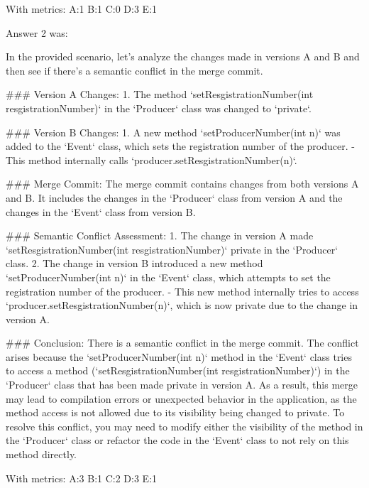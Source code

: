 With metrics:
A:1
B:1
C:0
D:3
E:1

Answer 2 was:
\begin{spverbatim}
In the provided scenario, let's analyze the changes made in versions A and B and then see if there's a semantic conflict in the merge commit.

### Version A Changes:
1. The method `setResgistrationNumber(int resgistrationNumber)` in the `Producer` class was changed to `private`.

### Version B Changes:
1. A new method `setProducerNumber(int n)` was added to the `Event` class, which sets the registration number of the producer.
   - This method internally calls `producer.setResgistrationNumber(n)`.

### Merge Commit:
The merge commit contains changes from both versions A and B. It includes the changes in the `Producer` class from version A and the changes in the `Event` class from version B.

### Semantic Conflict Assessment:
1. The change in version A made `setResgistrationNumber(int resgistrationNumber)` private in the `Producer` class.
2. The change in version B introduced a new method `setProducerNumber(int n)` in the `Event` class, which attempts to set the registration number of the producer.
   - This new method internally tries to access `producer.setResgistrationNumber(n)`, which is now private due to the change in version A.

### Conclusion:
There is a semantic conflict in the merge commit. The conflict arises because the `setProducerNumber(int n)` method in the `Event` class tries to access a method (`setResgistrationNumber(int resgistrationNumber)`) in the `Producer` class that has been made private in version A. As a result, this merge may lead to compilation errors or unexpected behavior in the application, as the method access is not allowed due to its visibility being changed to private. To resolve this conflict, you may need to modify either the visibility of the method in the `Producer` class or refactor the code in the `Event` class to not rely on this method directly.
\end{spverbatim}

With metrics:
A:3
B:1
C:2
D:3
E:1

